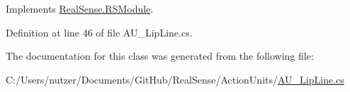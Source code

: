 Implements \hyperlink{class_real_sense_1_1_r_s_module_a2ec830b7932ee7c0077d473f81c73867}{Real\+Sense.\+R\+S\+Module}.



Definition at line 46 of file A\+U\+\_\+\+Lip\+Line.\+cs.



The documentation for this class was generated from the following file\+:\begin{DoxyCompactItemize}
\item 
C\+:/\+Users/nutzer/\+Documents/\+Git\+Hub/\+Real\+Sense/\+Action\+Units/\hyperlink{_a_u___lip_line_8cs}{A\+U\+\_\+\+Lip\+Line.\+cs}\end{DoxyCompactItemize}

